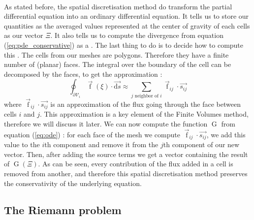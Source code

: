       \paragraph{}
      As stated before, the spatial discretisation method do transform the partial differential equation into an ordinary differential equation.
      It tells us to store our quantities as the averaged values represented at the center of gravity of each cells as our vector $\Xi$.
      It also tells us to compute the divergence from equation (\ref{eq:pde_conservative}) as a .
      The last thing to do is to decide how to compute this .
      The cells from our meshes are polygons.
      Therefore they have a finite number of (planar) faces.
      The integral over the boundary of the cell can be decomposed by the faces, to get the approximation :
      \begin{equation}
        \oint_{\partial\mathcal{V}_i} \vec{\operatorname{f}}\left(\xi\right) \cdot \vec{\mathrm{d}s} \approx \sum_{j\textrm{ neighbor of } i} \vec{\operatorname{f}}_{ij} \cdot \vec{s_{ij}}
      \end{equation}
      where $\vec{\operatorname{f}}_{ij} \cdot \vec{s_{ij}}$ is an approximation of the flux going through the face between cells $i$ and $j$.
      This approximation is a key element of the Finite Volumes method, therefore we will discuss it later.
      We can now compute the function $\operatorname{G}$ from equation (\ref{eq:ode}) : for each face of the mesh we compute $\vec{\operatorname{f}}_{ij} \cdot \vec{s_{ij}}$, we add this value to the $i$th component and remove it from the $j$th component of our new vector.
      Then, after adding the source terms we get a vector containing the result of $\operatorname{G}\left(\Xi\right)$.
      As can be seen, every contribution of the flux added in a cell is removed from another, and therefore this spatial discretisation method preserves the conservativity of the underlying equation.


    \subsection{The Riemann problem}


